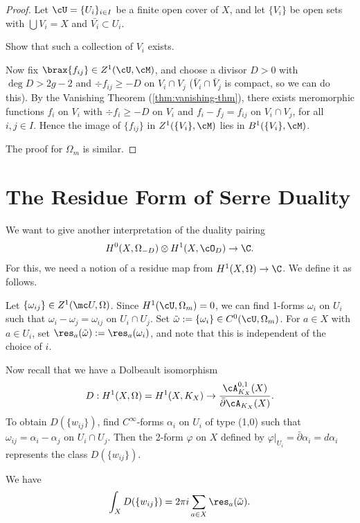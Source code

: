 \documentclass[11pt]{report}
\begin{document}
\begin{proof}
Let $\cU = \{U_i\}_{i \in I}$ be a finite open cover of $X$, and let $\{V_i\}$ be open sets with $\bigcup V_i =X$ and $\bar {V_i} \subset U_i$.
\begin{exercise}[]
Show that such a collection of $V_i$ exists.
\end{exercise}
Now fix $\brax{f_{ij}} \in Z^1(\cU,\cM)$, and choose a divisor $D>0$ with $\deg D > 2g-2$ and $\div f_{ij}\geq -D$ on $V_i \cap V_j$ ($\bar V_i \cap \bar V_j$ is compact, so we can do this). By the Vanishing Theorem (\cref{thm:vanishing-thm}), there exists meromorphic functions $f_i$ on $V_i$ with $\div f_i \geq -D$ on $V_i$ and $f_i -f_j = f_{ij}$ on $V_i \cap V_j$, for all $i,j \in I$. Hence the image of $\{f_{ij}\}$ in $Z^1(\{V_i\},\cM)$ lies in $B^1(\{V_i\},\cM)$.

The proof for $\Omega_m$ is similar.
\end{proof}

\section{The Residue Form of Serre Duality}

We want to give another interpretation of the duality pairing
\begin{align*}
H^0(X,\Omega_{-D}) \otimes H^1(X,\cO_D) \to \C.
\end{align*}
For this, we need a notion of a residue map from $H^1(X,\Omega)\to \C$. We define it as follows.

Let $\{\omega_{ij}\} \in Z^1(\mc U,\Omega)$. Since $H^1(\cU,\Omega_m)=0$, we can find 1-forms $\omega _i$ on $U_i$ such that $\omega_i-\omega_j = \omega_{ij}$ on $U_i \cap U_j$.  Set $\tilde \omega := \{\omega_i\} \in C^0(\cU,\Omega_m)$. For $a \in X$ with $a \in U_i$, set $\res_a(\tilde \omega):=\res_a(\omega_i)$, and note that this is independent of the choice of $i$. 

Now recall that we have a Dolbeault isomorphism
\begin{align*}
D: H^1 (X,\Omega) = H^1(X,K_X) \to \frac{\cA^{0,1}_{K_X}(X)}{\bar \partial \cA_{K_X}(X)}.
\end{align*}
To obtain $D(\{w_{ij}\})$, find $C^\infty$-forms $\alpha_i$ on $U_i$ of type (1,0) such that $\omega_{ij}=\alpha_i - \alpha_j$ on $U_i \cap U_j$. Then the 2-form $\varphi$ on $X$ defined by $\varphi|_{U_i}= \bar \partial \alpha _i = d\alpha _i$ represents the class $D(\{w_{ij}\})$.

\begin{lem}
We have \begin{align*}
\int_X D(\{w_{ij}\}) = 2\pi i \sum_{a \in X}\res_a(\tilde \omega).
\end{align*}
\end{lem}
\end{document}
